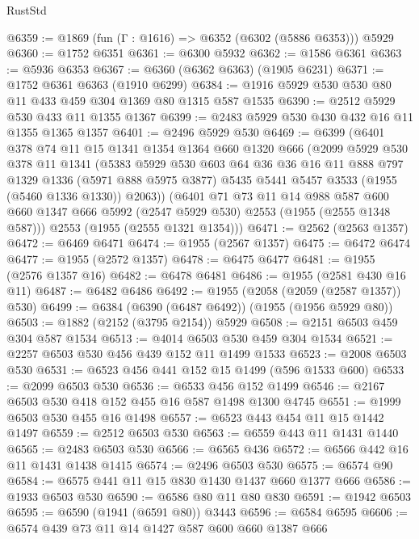 \begin{lexlean}{RustStd}
\begin{coremodule}
@6359 := @1869 (fun (Γ : @1616) => @6352 (@6302 (@5886 @6353))) @5929
@6360 := @1752 @6351
@6361 := @6300 @5932
@6362 := @1586 @6361
@6363 := @5936 @6353
@6367 := @6360 (@6362 @6363) (@1905 @6231)
@6371 := @1752 @6361 @6363 (@1910 @6299)
@6384 := @1916 @5929 @530 @530 @80 @11 @433 @459 @304 @1369 @80 @1315 @587 @1535
@6390 := @2512 @5929 @530 @433 @11 @1355 @1367
@6399 := @2483 @5929 @530 @430 @432 @16 @11 @1355 @1365 @1357
@6401 := @2496 @5929 @530
@6469 := @6399
    (@6401
      @378
      @74
      @11
      @15
      @1341
      @1354
      @1364
      @660
      @1320
      @666
      (@2099
        @5929
        @530
        @378
        @11
        @1341
        (@5383
          @5929
          @530
          @603
          @64
          @36
          @36
          @16
          @11
          @888
          @797
          @1329
          @1336
          (@5971 @888 @5975 @3877)
          @5435
          @5441
          @5457
          @3533
          (@1955 (@5460 @1336 @1330))
          @2063))
      (@6401
        @71
        @73
        @11
        @14
        @988
        @587
        @600
        @660
        @1347
        @666
        @5992
        (@2547 @5929 @530)
        @2553
        (@1955 (@2555 @1348 @587)))
      @2553
      (@1955 (@2555 @1321 @1354)))
@6471 := @2562 (@2563 @1357)
@6472 := @6469 @6471
@6474 := @1955 (@2567 @1357)
@6475 := @6472 @6474
@6477 := @1955 (@2572 @1357)
@6478 := @6475 @6477
@6481 := @1955 (@2576 @1357 @16)
@6482 := @6478 @6481
@6486 := @1955 (@2581 @430 @16 @11)
@6487 := @6482 @6486
@6492 := @1955 (@2058 (@2059 (@2587 @1357)) @530)
@6499 := @6384 (@6390 (@6487 @6492)) (@1955 (@1956 @5929 @80))
@6503 := @1882 (@2152 (@3795 @2154)) @5929
@6508 := @2151 @6503 @459 @304 @587 @1534
@6513 := @4014 @6503 @530 @459 @304 @1534
@6521 := @2257 @6503 @530 @456 @439 @152 @11 @1499 @1533
@6523 := @2008 @6503 @530
@6531 := @6523 @456 @441 @152 @15 @1499 (@596 @1533 @600)
@6533 := @2099 @6503 @530
@6536 := @6533 @456 @152 @1499
@6546 := @2167 @6503 @530 @418 @152 @455 @16 @587 @1498 @1300 @4745
@6551 := @1999 @6503 @530 @455 @16 @1498
@6557 := @6523 @443 @454 @11 @15 @1442 @1497
@6559 := @2512 @6503 @530
@6563 := @6559 @443 @11 @1431 @1440
@6565 := @2483 @6503 @530
@6566 := @6565 @436
@6572 := @6566 @442 @16 @11 @1431 @1438 @1415
@6574 := @2496 @6503 @530
@6575 := @6574 @90
@6584 := @6575 @441 @11 @15 @830 @1430 @1437 @660 @1377 @666
@6586 := @1933 @6503 @530
@6590 := @6586 @80 @11 @80 @830
@6591 := @1942 @6503
@6595 := @6590 (@1941 (@6591 @80)) @3443
@6596 := @6584 @6595
@6606 := @6574 @439 @73 @11 @14 @1427 @587 @600 @660 @1387 @666

\end{coremodule}
\end{lexlean}
